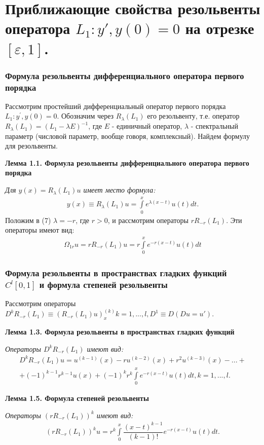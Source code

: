 \documentclass[10pt,utf8,presentation,notheorems]{beamer}
\theoremstyle{plain}
\theoremstyle{definition}
\begin{document}
\section{Приближающие свойства резольвенты оператора $ L_1:y', y(0)=0 $ на отрезке $ [\varepsilon ,1] $.}

\begin{frame}
\frametitle{Формула резольвенты дифференциального оператора первого порядка}
Рассмотрим простейший дифференциальный оператор первого порядка $ L_1:y^{'}, y(0)=0 $. Обозначим через $ R_\lambda(L_1) $ его резольвенту, т.е. оператор $ R_\lambda(L_1)=(L_1-\lambda E)^{-1} $, где $ E $ - единичный оператор, $ \lambda $ - спектральный параметр (числовой параметр,  вообще говоря, комплексный). Найдем формулу для резольвенты.

\label{lemma1.1}
\textbf{Лемма 1.1. Формула резольвенты дифференциального оператора первого порядка}

\textit{Для $ y(x) = R_\lambda(L_1)u$ имеет место формула:}
\begin{equation}
\begin{array}{c}
y(x) \equiv R_\lambda(L_1)u = \int\limits_0^x e^{\lambda(x-t)}u(t)dt.
\end{array}
\end{equation}
Положим в (7) $ \lambda = -r $, где $ r > 0 $, и рассмотрим операторы $ rR_{-r}(L_1)$. Эти операторы имеют вид:
\begin{equation}
\begin{array}{c}
\Omega_{1r}u = rR_{-r}(L_1)u = r \int\limits_0^x e^{-r(x-t)}u(t)dt
\end{array}
\end{equation}
\end{frame}

\begin{frame}
\frametitle{Формула резольвенты в пространствах гладких функций $ C^l[0,1] $ и формула степеней резольвенты}
Рассмотрим операторы $ D^kR_{-r}(L_1) \equiv (R_{-r}(L_1)u)_x^{(k)} k = 1,...,l, D^1 \equiv D (Du = u')$.

\label{lemma1.3}
\textbf{Лемма 1.3. Формула резольвенты в пространствах гладких функций}

\textit{Операторы $ D^kR_{-r}(L_1) $ имеют вид:}
\begin{equation}
\begin{array}{c}
D^kR_{-r}(L_1)u = u^{(k-1)}(x) - ru^{(k-2)}(x) + r^2u^{(k-3)}(x) - ... + \\
+ (-1)^{k-1}r^{k-1}u(x) + (-1)^kr^k\int\limits_0^x e^{-r(x-t)}u(t)dt, k = 1,...,l.
\end{array}
\end{equation}

\label{lemma1.5}
\textbf{Лемма 1.5. Формула степеней резольвенты}

\textit{Операторы $ (rR_{-r}(L_1))^k $ имеют вид:}
\begin{equation}
\begin{array}{c}
(rR_{-r}(L_1))^ku = r^k\int\limits_0^x \dfrac{(x-t)^{k-1}}{(k-1)!}e^{-r(x-t)}u(t)dt.
\end{array}
\end{equation}
\end{frame}
\end{document}
